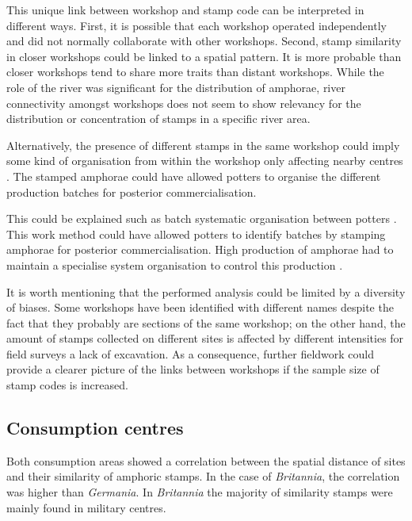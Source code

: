 \documentclass[review]{elsarticle}
\begin{document}
This unique link between workshop and stamp code can be interpreted in different ways. First, it is possible that each workshop operated independently and did not normally collaborate with other workshops.  Second, stamp similarity in closer workshops could be linked to a spatial pattern. It is more probable than closer workshops tend to share more traits than distant workshops. While the role of the river was significant for the distribution of amphorae, river connectivity amongst workshops does not seem to show relevancy for the distribution or concentration of stamps in a specific river area.

Alternatively, the presence of different stamps in the same workshop could imply some kind of organisation from within the workshop only affecting nearby centres \citep{juanmorostesis}. The stamped amphorae could have allowed potters to organise the different production batches for posterior commercialisation.

This could be explained such as batch systematic organisation between potters \citep{juanmorostesis}. This work method could have allowed potters to identify batches by stamping amphorae for posterior commercialisation. High production of amphorae had to maintain a specialise system organisation to control this production \citep[104]{juanmorostesis}.




It is worth mentioning that the performed analysis could be limited by a diversity of biases. Some workshops have been identified with different names despite the fact that they probably are sections of the same workshop; on the other hand, the amount of stamps collected on different sites is affected by different intensities for field surveys a lack of excavation. As a consequence, further fieldwork could provide a clearer picture of the links between workshops if the sample size of stamp codes is increased.

\subsection{Consumption centres}

Both consumption areas showed a correlation between the spatial distance of sites and their similarity of amphoric stamps. In the case of  \textit{Britannia}, the correlation was higher than \textit{Germania}. In \textit{Britannia} the majority of similarity stamps were mainly found in military centres.  
\end{document}
